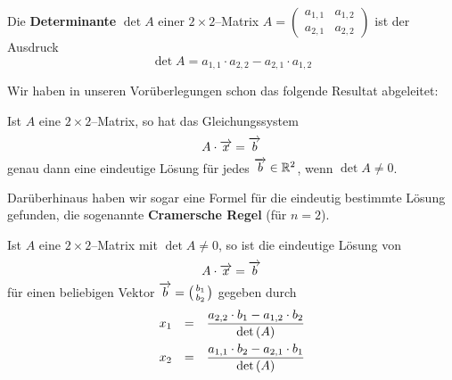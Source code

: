 \begin{definition} Die \textbf{Determinante} $\det{A}$ einer 
$2 \times 2$--Matrix $A = \left( \begin{smallmatrix} a_{1,1} & a_{1,2} \\ a_{2,1} & a_{2,2} 
\end{smallmatrix} \right) $ ist der Ausdruck
  	$$ \det{A} = a_{1,1} \cdot a_{2,2} - a_{2,1} \cdot a_{1,2} $$
\end{definition}

\bigbreak

Wir haben in unseren Vorüberlegungen schon das folgende Resultat abgeleitet:

\begin{satz}\label{det_eindeutig_2} Ist $A$ eine $2 \times 2$--Matrix, so hat das Gleichungssystem
  	$$ A  \cdot \overrightarrow{x} = \overrightarrow{b} $$
genau dann eine eindeutige Lösung für jedes $\overrightarrow{b} \in \mathbb R^2$, wenn $\det{A} \neq 0$.
\end{satz}

Darüberhinaus haben wir sogar eine Formel für die eindeutig bestimmte Lösung gefunden, die sogenannte 
\textbf{Cramersche Regel} (für $n = 2$).

\begin{satz}\label{cramer_regel_2} Ist $A$ eine $2 \times 2$--Matrix mit $\det{A} \neq 0$, so ist 
die eindeutige Lösung von 
  	$$ A  \cdot \overrightarrow{x} = \overrightarrow{b} $$
für einen beliebigen Vektor $ \overrightarrow{b} = \left( \begin{smallmatrix} b_1 \\ b_2 
\end{smallmatrix} \right)$ gegeben durch 
  	$$ \begin{array} {l c l}
   	x_1 & = & \dfrac {a_{2,2} \cdot b_1 - a_{1,2} \cdot b_2}{\det{A}} \\[1.0em]
   	x_2 & = & \dfrac {a_{1,1} \cdot b_2 - a_{2,1} \cdot b_1}{\det{A}}
  	\end{array} $$
\end{satz}

\bigbreak

